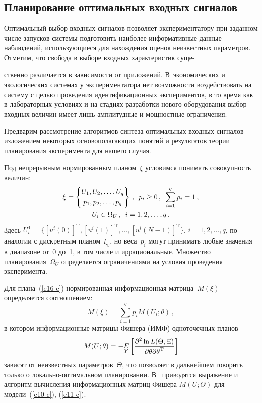 \begin{multicols}{2}
\vspace*{-8pt}

\section{Планирование оптимальных входных сигналов}

\vspace*{-2pt}

     Оптимальный выбор входных сигналов позволяет экспериментатору при
заданном чис\-ле запусков системы подготовить наиболее информативные
данные наблюдений, использующиеся для на\-хож\-де\-ния оценок неизвестных
параметров. Отметим, что свобода в выборе входных характеристик
суще-\linebreak\vspace*{-12pt}
\pagebreak

\noindent
ственно различается в зависимости от приложений. В~экономических и
экологических системах у экспериментатора нет возможности воздействовать
на систему с целью проведения идентификационных экспериментов, в то время
как в лабораторных условиях и на стадиях разработки нового оборудования
выбор входных величин имеет лишь амплитудные и мощностные ограничения.

  Предварим рассмотрение алгоритмов синтеза оптимальных входных
сигналов изложением некоторых основополагающих понятий и результатов
теории планирования эксперимента для нашего случая.

  Под непрерывным нормированным планом~$\xi$ условимся понимать
совокупность величин:
  \begin{multline}
  \xi =
    \left \{
  \begin{matrix}
  U_1, U_2, \ldots , U_q\\[3pt]
  p_1, p_2, \ldots , p_q
  \end{matrix}
  \right \}\,, \enskip p_i\geq 0\,,\enskip
  \sum\limits_{i=1}^q p_i=1\,,\\
  U_i\in \Omega_U\,,\enskip   i=1, 2, \ldots , q\,.
    \label{e16-c}
\end{multline}
Здесь $U_i^{\mathrm{T}}=\{[u^i(0)]^{\mathrm{T}}, [u^i(1)]^{\mathrm{T}}, \ldots , [u^i(N-1)]^{\mathrm{T}}\}$, $i=1, 2, \ldots ,q$,
по аналогии с дискретным планом~$\xi_v$, но веса~$p_i$ могут принимать
любые значения в диапазоне от~0 до~1, в том числе и иррациональные.
Множество планирования~$\Omega_U$ определяется ограничениями на
условия проведения эксперимента.

  Для плана~(\ref{e16-c}) нормированная информационная матрица~$M(\xi)$
определяется соотношением:
  \begin{equation}
  M(\xi)=\sum\limits_{i=1}^q p_i M(U_i;\theta)\,,\label{e17-c}
  \end{equation}
в котором информационные матрицы Фишера (ИМФ) одноточечных планов
$$
M(U;\theta)=- \underset{Y}{E} \left [ \displaystyle\frac{\displaystyle \partial^2\ln L(\Theta,
\Xi)\mathstrut}{\displaystyle \partial\theta\partial\theta^{\mathrm{T}}\mathstrut}\right]
$$
зависят от неизвестных параметров~$\Theta$, что позволяет в дальнейшем
говорить только о локально-оп\-ти\-маль\-ном планировании. В~\cite{19-c}
приводятся выражение и алгоритм вычисления информационных матриц
Фишера $M(U;\Theta)$ для модели~(\ref{e10-c}), (\ref{e11-c}).


\end{multicols}
